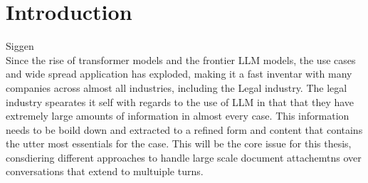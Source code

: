 \section{Introduction}

Siggen \\
Since the rise of transformer models and the frontier LLM models, the use cases and wide spread application has exploded, making it a fast inventar with many companies across almost all industries, including the Legal industry. The legal industry spearates it self with regards to the use of LLM in that that they have extremely large amounts of information in almost every case. This information needs to be boild down and extracted to a refined form and content that contains the utter most essentials for the case. This will be the core issue for this thesis, consdiering different approaches to handle large scale document attachemtns over conversations that extend to multuiple turns. 

